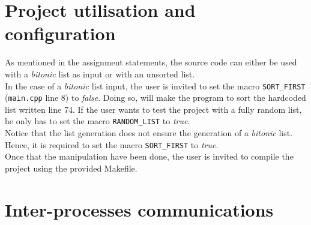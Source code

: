 \documentclass[a4paper,11pt]{article}
\begin{document}
\section{Project utilisation and configuration}

  As mentioned in the assignment statements, the source code can either be used with a \textit{bitonic} list as input or with an unsorted list.\\
  In the case of a \textit{bitonic} list input, the user is invited to set the macro \verb|SORT_FIRST| (\verb|main.cpp| line 8) to \textit{false}. Doing so, will make the program to sort the hardcoded list written line 74. If the user wants to test the project with a fully random list, he only has to set the macro \verb|RANDOM_LIST| to \textit{true}.\\
  Notice that the list generation does not ensure the generation of a \textit{bitonic} list. Hence, it is required to set the macro \verb|SORT_FIRST| to \textit{true}.\\
  Once that the manipulation have been done, the user is invited to compile the project using the provided Makefile.

\section{Inter-processes communications}
\end{document}
